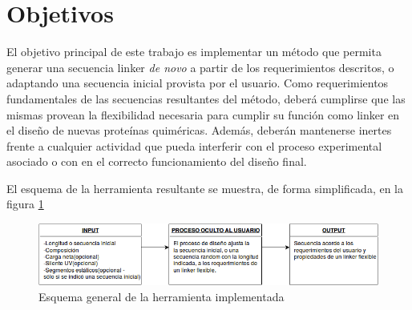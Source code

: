        
       
       
       
       
       
       
\section{Objetivos}

El objetivo principal de este trabajo es implementar un método que permita generar una secuencia linker \textit{de novo} a partir de los requerimientos descritos, o adaptando una secuencia inicial provista por el usuario. %
Como requerimientos fundamentales de las secuencias resultantes del método, deberá cumplirse que las mismas provean la flexibilidad necesaria para cumplir su función como linker en el diseño de nuevas proteínas quiméricas.
Además, deberán mantenerse inertes frente a cualquier actividad que pueda interferir con el proceso experimental asociado o con en el correcto funcionamiento del diseño final.


El esquema de la herramienta resultante se muestra, de forma simplificada, en la figura \ref{diagram}

\begin{figure}[h!]
\centering
   \includegraphics[width=\textwidth]{img/diagram.png}
 \caption{Esquema general de la herramienta implementada}
 \label{diagram}
\end{figure}

